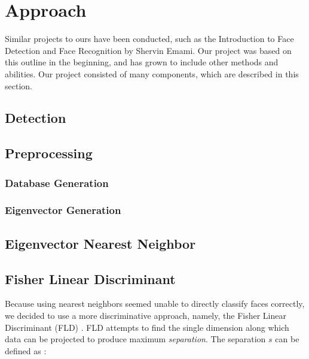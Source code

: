 
\section{Approach} %

Similar projects to ours have been conducted, such as the Introduction
to Face Detection and Face Recognition by Shervin Emami\cite{Emami}.
Our project was based on this outline in the beginning, and has grown
to include other methods and abilities.  Our project consisted of many
components, which are described in this section.



\subsection{Detection}



\subsection{Preprocessing}


\subsubsection{Database Generation}
\subsubsection{Eigenvector Generation}



\subsection{Eigenvector Nearest Neighbor}



\subsection{Fisher Linear Discriminant}


Because using nearest neighbors seemed unable to directly classify
faces correctly, we decided to use a more discriminative approach,
namely, the Fisher Linear Discriminant (FLD) \cite{wikiFld}.  FLD
attempts to find the single dimension along which data can be
projected to produce maximum \emph{separation}.  The separation $s$
can be defined as \cite{wikiFld}:

